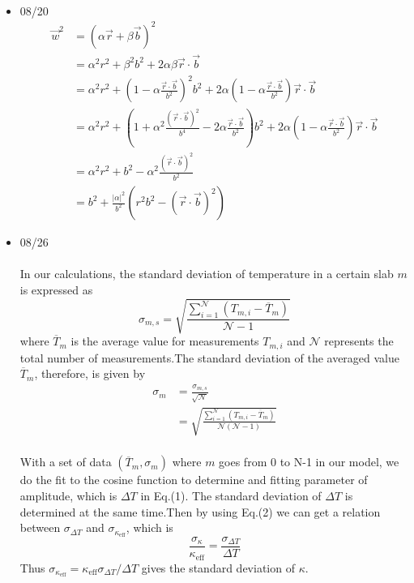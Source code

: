 \documentclass{article}
\author{}
\begin{document}
\paragraph*{}
\begin{itemize}
\item \mbox{08/20}
\begin{align*}
\vec{w}^2&=(\alpha\vec{r}+\beta\vec{b})^2 \\
&=\alpha^2r^2+\beta^2b^2+2\alpha\beta\vec{r}\cdot\vec{b}\\
&=\alpha^2r^2+(1-\alpha\frac{\vec{r}\cdot\vec{b}}{b^2})^2b^2+2\alpha(1-\alpha\frac{\vec{r}\cdot\vec{b}}{b^2})\vec{r}\cdot\vec{b}\\
&=\alpha^2r^2+(1+\alpha^2\frac{(\vec{r}\cdot\vec{b})^2}{b^4}-2\alpha\frac{\vec{r}\cdot\vec{b}}{b^2})b^2+2\alpha(1-\alpha\frac{\vec{r}\cdot\vec{b}}{b^2})\vec{r}\cdot\vec{b}\\
&=\alpha^2r^2+b^2-\alpha^2\frac{(\vec{r}\cdot\vec{b})^2}{b^2}\\
&=b^2+\frac{\vert\alpha\vert^2}{b^2}(r^2b^2-(\vec{r}\cdot\vec{b})^2)
\end{align*}
\item 08/26
\paragraph*{}
In our calculations, the standard deviation of temperature in a certain slab $m$ is expressed as
\begin{equation}
\sigma_{m,s}=\sqrt{\frac{\sum\limits_{i=1}^\mathcal{N}\left( T_{m,i}-\overline{T}_m\right)}{\mathcal{N}-1}}
\end{equation}
where $\overline{T}_m$ is the average value for measurements $T_{m,i}$ and $\mathcal{N}$ represents the total number of measurements.The standard deviation of the averaged value $\overline{T}_m$, therefore, is given by
\begin{align}
\sigma_m &=\frac{\sigma_{m,s}}{\sqrt{\mathcal{N}}}\\
&=\sqrt{\frac{\sum\limits_{i=1}^\mathcal{N}\left( T_{m,i}-\overline{T}_m\right)}{\mathcal{N}(\mathcal{N}-1)}}
\end{align}
\paragraph*{}
With a set of data $(\overline{T}_m,\sigma_m)$ where $m$ goes from 0 to N-1 in our model, we do the fit to the cosine function to determine and fitting parameter of amplitude, which is $\Delta T$ in Eq.(1). The standard deviation of $\Delta T$ is determined at the same time.Then by using Eq.(2) we can get a relation between $\sigma_{\Delta T}$ and $\sigma_{\kappa_{\mbox{eff}}}$, which is
\begin{equation}
\frac{\sigma_{\kappa}}{\kappa_{\mbox{eff}}}=\frac{\sigma_{\Delta T}}{\Delta T}
\end{equation}
Thus $\sigma_{\kappa_{\mbox{eff}}}=\kappa_{\mbox{eff}}\sigma_{\Delta{T}}/\Delta{T}$ gives the standard deviation of $\kappa$.
\end{itemize}
\end{document}
